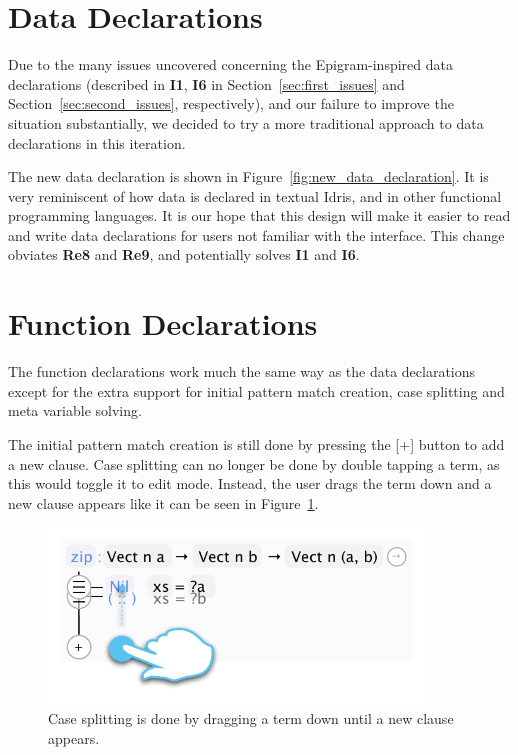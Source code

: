 \section{Data Declarations}
\label{subsec:new_design_data_dec}
Due to the many issues uncovered concerning the Epigram-inspired data declarations (described in \textbf{I1}, \textbf{I6} in Section~\ref{sec:first_issues} and Section~\ref{sec:second_issues}, respectively), and our failure to improve the situation substantially, we decided to try a more traditional approach to data declarations
in this iteration.

The new data declaration is shown in Figure~\ref{fig:new_data_declaration}.
It is very reminiscent of how data is declared in textual Idris, and in other functional programming languages.
It is our hope that this design will make it easier to read and write data declarations for users not familiar with the interface. This change obviates \textbf{Re8} and \textbf{Re9}, and potentially solves \textbf{I1} and \textbf{I6}.

\section{Function Declarations}
\label{subsec:new_design_function_dec}
The function declarations work much the same way as the data declarations
except for the extra support for initial pattern match creation, case splitting
and meta variable solving.

The initial pattern match creation is still done by pressing the [+] button to
add a new clause. Case splitting can no longer be done by double tapping a
term, as this would toggle it to edit mode. Instead, the user drags the term
down and a new clause appears like it can be seen in Figure~\ref{fig:case_splitting}.

\begin{figure}
	\centering
		\includegraphics[width=100mm]{diagrams/design_case_splitting.pdf}
	\caption{Case splitting is done by dragging a term down until a new clause
	appears.}
\label{fig:case_splitting}
\end{figure}

